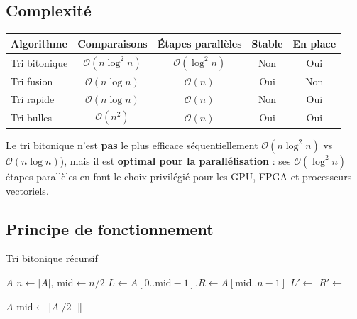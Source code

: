 \documentclass[12pt,a4paper]{article}
\newcommand{\Oh}[1]{\mathcal{O}\!\left(#1\right)}
\begin{document}
\subsection{Complexité}

\begin{center}
\begin{tabular}{lcccc}
\toprule
\textbf{Algorithme} & \textbf{Comparaisons} & \textbf{Étapes parallèles}
                    & \textbf{Stable} & \textbf{En place} \\
\midrule
Tri bitonique    & $\Oh{n \log^2 n}$ & $\Oh{\log^2 n}$ & Non & Oui \\
Tri fusion       & $\Oh{n \log n}$   & $\Oh{n}$        & Oui & Non \\
Tri rapide       & $\Oh{n \log n}$   & $\Oh{n}$        & Non & Oui \\
Tri bulles       & $\Oh{n^2}$        & $\Oh{n}$        & Oui & Oui \\
\bottomrule
\end{tabular}
\end{center}

\begin{warningbox}
Le tri bitonique n'est \textbf{pas} le plus efficace séquentiellement
$\Oh{n\log^2 n}$ vs $\Oh{n\log n}$), mais il est \textbf{optimal pour la
parallélisation} : ses $\Oh{\log^2 n}$ étapes parallèles en font le choix
privilégié pour les GPU, FPGA et processeurs vectoriels.
\end{warningbox}

\subsection{Principe de fonctionnement}

\begin{algorithmbox}{Tri bitonique récursif}
\begin{algorithm}[H]
\caption{Tri bitonique}
\begin{algorithmic}[1]
   \Return $A$ \EndIf
  \State $n \gets |A|$, $\text{mid} \gets n/2$
  \State $L \gets A[0..\text{mid}-1]$,\quad $R \gets A[\text{mid}..n-1]$
  \State $L' \gets $ 
  \State $R' \gets $ 
  \State \Return {}
\EndProcedure

   \Return $A$ \EndIf
  \State $\text{mid} \gets |A|/2$
      \State {}
      \State {}
    \EndIf
  \EndFor
  \State \Return {}
         $\|$ 
\EndProcedure
\end{algorithmic}
\end{algorithm}
\end{algorithmbox}
\end{document}
